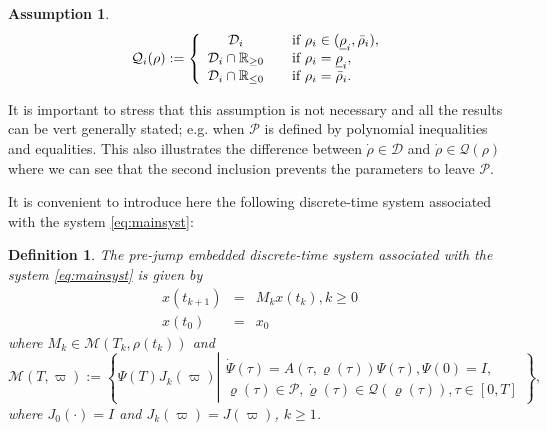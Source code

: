 \documentclass[12pt]{article}
\newtheorem{define}[theorem]{Definition}
\newtheorem{assumption}[theorem]{Assumption}
\begin{document}
{\begin{assumption}
\begin{equation}
  \mathcal{Q}_i(\rho):=\left\{\begin{array}{ccl}
    \mathcal{D}_i&&\textnormal{if }\rho_i\in(\underline{\rho}_i,\bar{\rho}_i),\\
    \mathcal{D}_i\cap\mathbb{R}_{\ge0}&&\textnormal{if }\rho_i=\underline{\rho}_i,\\
    \mathcal{D}_i\cap\mathbb{R}_{\le0}&&\textnormal{if }\rho_i=\bar{\rho}_i.
  \end{array}\right.
\end{equation}
\end{assumption}
%
It is important to stress that this assumption is not necessary and all the results can be vert generally stated; e.g. when $\mathcal{P}$ is defined by polynomial inequalities and equalities. This also illustrates the difference between $\dot{\rho}\in\mathcal{D}$ and $\dot{\rho}\in\mathcal{Q}(\rho)$ where we can see that the second inclusion prevents the parameters to leave $\mathcal{P}$.}

It is convenient to introduce here the following discrete-time system associated with the system \eqref{eq:mainsyst}:
\begin{define}
  The \emph{pre-jump embedded discrete-time system} associated with the system \eqref{eq:mainsyst} is given by
  \begin{equation}\label{eq:mainsystDT1}
\begin{array}{rcl}
    x(t_{k+1})&=&M_kx(t_k),k\ge0\\
    x(t_0)&=&x_0
\end{array}
\end{equation}
where $M_k\in\mathcal{M}(T_k,\rho(t_k))$ and
\begin{equation}
\mathcal{M}(T,\varpi):=\left\{\Psi(T)J_k(\varpi)\left|\begin{array}{l}
\dot{\Psi}(\tau)=A(\tau,\varrho(\tau))\Psi(\tau),\Psi(0)=I,\\
\varrho(\tau)\in\mathcal{P}, \dot{\varrho}(\tau)\in\mathcal{Q}(\varrho(\tau)),\tau\in[0,T]
\end{array}\right.\right\},\label{eq:Mkm}
\end{equation}
where $J_0(\cdot)=I$ and $J_k(\varpi)=J(\varpi)$, $k\ge1$.
\end{define}
\end{document}
